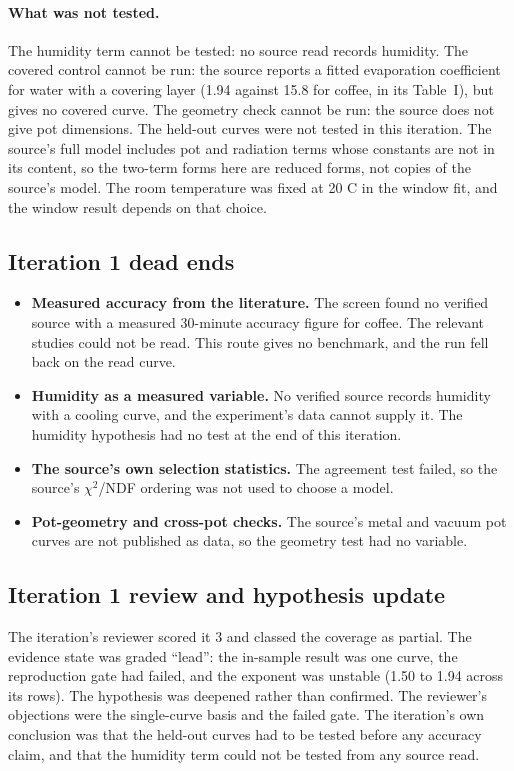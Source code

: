 \documentclass[11pt,letterpaper]{article}
\begin{document}
\paragraph{What was not tested.} The humidity term cannot be tested: no source read records humidity. The covered control cannot be run: the source reports a fitted evaporation coefficient for water with a covering layer (1.94 against 15.8 for coffee, in its Table~I), but gives no covered curve. The geometry check cannot be run: the source does not give pot dimensions. The held-out curves were not tested in this iteration. The source's full model includes pot and radiation terms whose constants are not in its content, so the two-term forms here are reduced forms, not copies of the source's model. The room temperature was fixed at 20 C in the window fit, and the window result depends on that choice.

\subsection{Iteration 1 dead ends}

\begin{itemize}
\item \textbf{Measured accuracy from the literature.} The screen found no verified source with a measured 30-minute accuracy figure for coffee. The relevant studies could not be read. This route gives no benchmark, and the run fell back on the read curve.
\item \textbf{Humidity as a measured variable.} No verified source records humidity with a cooling curve, and the experiment's data cannot supply it. The humidity hypothesis had no test at the end of this iteration.
\item \textbf{The source's own selection statistics.} The agreement test failed, so the source's $\chi^2$/NDF ordering was not used to choose a model.
\item \textbf{Pot-geometry and cross-pot checks.} The source's metal and vacuum pot curves are not published as data, so the geometry test had no variable.
\end{itemize}

\subsection{Iteration 1 review and hypothesis update}

The iteration's reviewer scored it 3 and classed the coverage as partial. The evidence state was graded ``lead'': the in-sample result was one curve, the reproduction gate had failed, and the exponent was unstable (1.50 to 1.94 across its rows). The hypothesis was deepened rather than confirmed. The reviewer's objections were the single-curve basis and the failed gate. The iteration's own conclusion was that the held-out curves had to be tested before any accuracy claim, and that the humidity term could not be tested from any source read.
\end{document}
